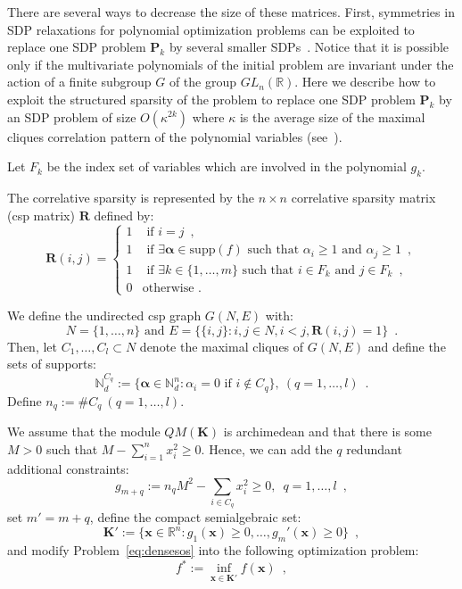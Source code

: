 \documentclass[a4paper,10pt]{article}
\newcommand{\suppf}[1]{\text{supp}(#1)}
\newcommand{\mons}[2]{\N_{#1}^{#2}}
\newcommand{\R}{\mathbb{R}}
\newcommand{\N}{\mathbb{N}}
\newcommand{\x}{\mathbf{x}}
\newcommand{\alphab}{\boldsymbol{\alpha}}
\def\P{\mathbf{P}}
\def\K{\mathbf{K}}
\theoremstyle{plain}
\theoremstyle{definition}
\theoremstyle{remark}
\begin{document}
There are several ways to decrease the size of these matrices. 
First, symmetries in SDP relaxations for polynomial optimization problems can be exploited to replace one SDP problem $\P_k$ by
several smaller SDPs~\cite{Riener2013SymmetricSDP}. Notice that it is possible only if the multivariate polynomials of the initial problem are invariant under the action of a finite subgroup $G$ of the group $GL_{n}(\R)$. 
%
Here we describe how to exploit the structured sparsity of the
problem to replace one SDP problem $\P_k$ by an SDP problem of
size $O (\kappa^ {2 k})$ where $\kappa$ is the average size
of the maximal cliques correlation pattern of the polynomial
variables (see~\cite{Waki06SparseSOS}). 


Let $F_k$ be the index set of variables which are involved in the polynomial $g_k$. 
 
The correlative sparsity is represented by the 
$n \times n$ correlative sparsity matrix (csp matrix) $\mathbf{R}$ defined by:
\begin{equation}
\label{eq:csp}
\mathbf{R}(i, j) = \left \{
\begin{array}{ll}
  1 & \text{ if }  i = j \enspace, \\
  1 & \text{ if }  \exists \alphab \in \suppf{f} \text{ such that } \alpha_i \geq 1 \text{ and } \alpha_j \geq 1\enspace, \\
  1 & \text{ if }  \exists k \in \{1, \dots, m\} \text{ such that } i \in F_k \text{ and } j \in F_k \enspace,\\
  0 & \text{otherwise .} 
\end{array} \right.
\end{equation}

We define the undirected csp graph $G(N, E)$ with:
 \[ N = \{1, \dots, n\} \text{ and } E = \{ \{i, j\} : i, j \in N, i < j, \mathbf{R}(i, j) = 1 \} \enspace. \]
Then, let $C_1,\dots, C_l \subset N$ denote the maximal cliques of $G(N, E)$ and define the sets of supports: 
\[\mons{d}{C_q} := \{ \alphab \in  \mons{d}{n} : \alpha_i = 0 \text{ if } i \notin C_q \}, \ (q=1 ,\dots,l)\enspace. \]
Define $n_q := \#C_q \ (q=1 ,\dots,l)$.

We assume that the module $QM(\K)$ is archimedean and that there is some $M > 0$ such that $M - \sum_{i = 1}^{n} {x_i^2} \geq 0$. Hence, we can add the $q$ redundant additional constraints:
\begin{equation}
\label{eq:assum_sos_sparse}
g_{m + q} := n_q M^2 - \sum_{i \in C_q} {x_i^2} \geq 0, \enspace q=1 ,\dots, l\enspace,
\end{equation}
set $m' = m + q$, define the compact semialgebraic set:
\[\K' := \{ \x \in \R^{n} : g_1 (\x) \geq 0, \dots, g_m' (\x) \geq 0\}\enspace,\]
and modify Problem~\eqref{eq:densesos} into the following optimization problem:
\begin{equation}
\label{eq:cons_pop_sparse}
f^*  :=  \inf_{\x \in \K'} f (\x)\enspace,
\end{equation}
\end{document}
